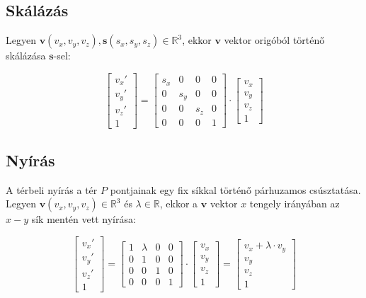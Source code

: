 \subsection{Skálázás}

Legyen $\mathbf{v}(v_x, v_y, v_z), \mathbf{s}(s_x, s_y, s_z)\in\mathbb{R}^3$, ekkor $\mathbf{v}$ vektor origóból történő skálázása $\mathbf{s}$-sel:

\[\left[\begin{array}{c}v_x' \\v_y' \\v_z' \\ 1 \end{array}\right] = \left[\begin{array}{cccc}s_x & 0 & 0 & 0\\0 & s_y & 0 & 0\\ 0 & 0 & s_z & 0\\ 0 & 0 & 0 & 1\end{array}\right] \cdot \left[\begin{array}{c}v_x\\ v_y\\ v_z\\ 1\end{array}\right]\]

\subsection{Nyírás}

A térbeli nyírás a tér $P$ pontjainak egy fix síkkal történő párhuzamos csúsztatása. Legyen $\mathbf{v}(v_x, v_y, v_z)\in\mathbb{R}^3$ és $\lambda\in\mathbb{R}$, ekkor a $\mathbf{v}$ vektor $x$ tengely irányában az $x-y$ sík mentén vett nyírása:

\[\left[\begin{array}{c}v_x' \\v_y' \\v_z' \\ 1 \end{array}\right] = \left[\begin{array}{cccc}1 & \lambda & 0 & 0\\0 & 1 & 0 & 0\\ 0 & 0 & 1 & 0\\ 0 & 0 & 0 & 1\end{array}\right] \cdot \left[\begin{array}{c}v_x\\ v_y\\ v_z\\ 1\end{array}\right] = \left[\begin{array}{c}v_x + \lambda\cdot v_y\\ v_y\\ v_z\\ 1\end{array}\right]\]

